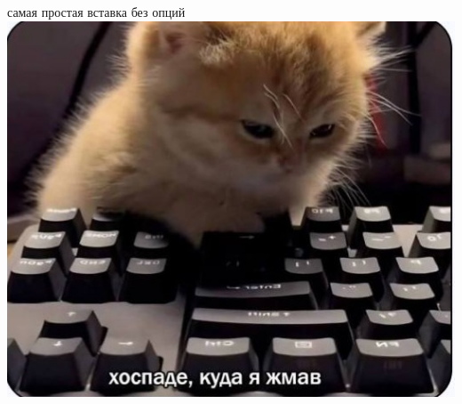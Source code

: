 \documentclass{article}
\begin{document}
самая простая вставка без опций \\
\includegraphics{mem} 
\newpage

\end{document}
